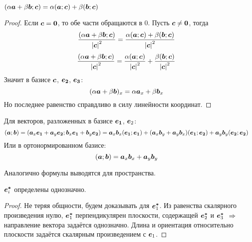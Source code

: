 \begin{theorem}
    $(\alpha \bm{a} + \beta \bm{b}; \bm{c}) = \alpha(\bm{a}; \bm{c}) + \beta(\bm{b}; \bm{c})$
\end{theorem}
\begin{proof}
    Если $\bm{c} = \bm{0}$, то обе части обращаются в 0. Пусть $\bm{c} \ne \bm{0}$, тогда
    \[ \frac{(\alpha \bm{a} + \beta \bm{b}; \bm{c})}{\left\lvert \bm{c} \right\rvert^2} = \frac{\alpha(\bm{a}; \bm{c}) + \beta(\bm{b}; \bm{c})}{\left\lvert \bm{c} \right\rvert^2} \]
    \[ \frac{(\alpha \bm{a} + \beta \bm{b}; \bm{c})}{\left\lvert \bm{c} \right\rvert^2} = \frac{\alpha(\bm{a}; \bm{c})}{\left\lvert \bm{c} \right\rvert^2} + \frac{\beta(\bm{b}; \bm{c})}{\left\lvert \bm{c} \right\rvert^2} \]
    Значит в базисе $\bm{c}$, $\bm{e_2}$, $\bm{e_3}$:
    \[ (\alpha \bm{a} + \beta \bm{b})_x = \alpha\bm{a}_x + \beta\bm{b}_x \]
    Но последнее равенство справдливо в силу линейности координат.
\end{proof}

Для векторов, разложенных в базисе $\bm{e_1}$, $\bm{e}_2$:
\[
    (\bm{a}; \bm{b}) =
    (\bm{a}_x \bm{e_1} + \bm{a}_y \bm{e_2}; \bm{b}_x \bm{e_1} + \bm{b}_y \bm{e_2}) =
    \bm{a}_x \bm{b}_x (\bm{e_1}; \bm{e_1}) + 
    (\bm{a}_x \bm{b}_y + \bm{a}_y \bm{b}_x) (\bm{e_1}; \bm{e_2}) + 
    \bm{a}_y \bm{b}_y (\bm{e_2}; \bm{e_2})
\]
Или в ортонормированном базисе:
\[ (\bm{a}; \bm{b}) = \bm{a}_x \bm{b}_x + \bm{a}_y \bm{b}_y \]

Аналогично формулы выводятся для пространства.


\begin{proposition}
    $\bm{e^*}_i$ определены однозначно.
\end{proposition}
\begin{proof}
    Не теряя общности, будем доказывать для $\bm{e^*}_1$. Из равенства скалярного произведения нулю, $\bm{e^*}_1$ перпендикулярен плоскости, содержащей $\bm{e^*}_2$ и $\bm{e^*}_3$ $\;\Rightarrow\;$ направление вектора задаётся однозначно. Длина и ориентация относительно плоскости задаётся скалярным произведением с $\bm{e}_1$.
\end{proof}

